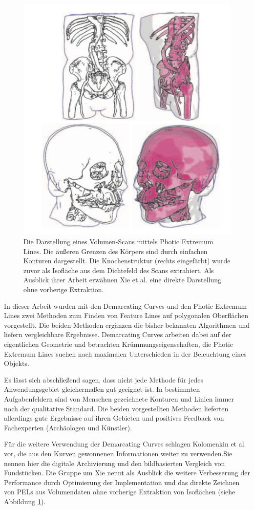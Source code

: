 \documentclass{paperStyle}
\begin{document}
\begin{figure}
	\centering
		\includegraphics[width=0.9\linewidth]{ausblpel.png}
	\caption{Die Darstellung eines Volumen-Scans mittels Photic Extremum Lines. Die äußeren Grenzen des Körpers sind durch einfachen Konturen dargestellt. Die Knochenstruktur (rechts eingefärbt) wurde zuvor als Isofläche aus dem Dichtefeld des Scans extrahiert. Als Ausblick ihrer Arbeit erwähnen Xie et al. eine direkte Darstellung ohne vorherige Extraktion. \cite{Xie2007}}
	\label{ausblpel}
\end{figure}
In dieser Arbeit wurden mit den Demarcating Curves und den Photic Extremum Lines zwei Methoden zum Finden von Feature Lines auf polygonalen Oberflächen vorgestellt. Die beiden Methoden ergänzen die bisher bekannten Algorithmen und liefern vergleichbare Ergebnisse. Demarcating Curves arbeiten dabei auf der eigentlichen Geometrie und betrachten Krümmungseigenschaften, die Photic Extremum Lines suchen nach maximalen Unterschieden in der Beleuchtung eines Objekts. 

Es lässt sich abschließend sagen, dass nicht jede Methode für jedes Anwendungsgebiet gleichermaßen gut geeignet ist. In bestimmten Aufgabenfeldern sind von Menschen gezeichnete Konturen und Linien immer noch der qualitative Standard. Die beiden vorgestellten Methoden lieferten allerdings gute Ergebnisse auf ihren Gebieten und positives Feedback von Fachexperten (Archäologen und Künstler).

Für die weitere Verwendung der Demarcating Curves schlagen Kolomenkin et al. \cite{Demarcating} vor, die aus den Kurven gewonnenen Informationen weiter zu verwenden.Sie nennen hier die digitale Archivierung und den bildbasierten Vergleich von Fundstücken.  
Die Gruppe um Xie nennt als Ausblick die weitere Verbesserung der Performance durch Optimierung der Implementation und das direkte Zeichnen von PELs aus Volumendaten ohne vorherige Extraktion von Isoflächen (siehe Abbildung \ref{ausblpel}). 



\end{document}
